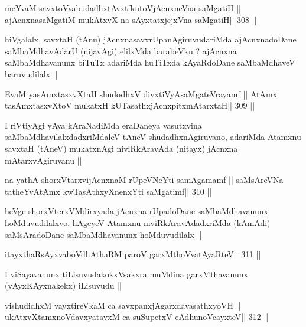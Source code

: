 \begin{shl}
meYvaM savxtoV\s vabudadhxtAvxtfkutoV\s jAcnxneVna saMgatiH ||
ajAcnxnasaMgatiM mukAtxvX na sAyxtatxjejxVna saMgatiH\hfill || 308 ||
\end{shl}

\begin{artha}
hiVgalalx, savxtaH (tAnu) jAcnxnasavxrUpanAgiruvudariMda ajAcnxnadoDane saMbaMdhavAdarU (nijavAgi) elilxMda barabeVku ? ajAcnxna saMbaMdhavanunx biTuTx adariMda huTiTxda kAyaRdoDane saMbaMdhaveV baruvudilalx ||
\end{artha}

\begin{shl}
EvaM yasAmxtasxvXtaH shudodhxV divxtiVyAsaMgateVrayamf ||
AtAmx tasAmxtasxvXtoV mukatxH kUTasathxjAcnxpitxmAtarxtaH\footnotemark[1]\hfill || 309 ||
\end{shl}

\begin{artha}
I riVtiyAgi yAva kAraNadiMda eraDaneya vasutxvina saMbaMdhavilalxdadxriMdaleV tAneV shudadhxnAgiruvano, adariMda Atamxnu savxtaH (tAneV) mukatxnAgi niviRkAravAda (nitayx) jAcnxna mAtarxvAgiruvanu ||
\end{artha}

\begin{shl}
na yathA shorxVtarxvijAcnxnaM rUpeVNeYti samAgamamf ||
saMsAreVNa tatheYvA\s\s tAmx kwTasAthxyXnenxYti saMgatimf\hfill || 310 ||
\end{shl}

\begin{artha}
heVge shorxVterxVMdirxyada jAcnxna rUpadoDane saMbaMdhavanunx hoMduvudilalxvo, hAgeyeV Atamxnu niviRkAravAdadxriMda (kAmAdi) saMsAradoDane saMbaMdhavanunx hoMduvudilalx ||
\end{artha}

\begin{shl}
itayxthaRsAyxvaboVdhAthaRM paroV garxMthoV\s vatAyaRteV\hfill || 311 ||
\end{shl}

\begin{artha}
I viSayavanunx tiLisuvudakokxVsakxra muMdina garxMthavanunx (vAyxKAyxnakekx) iLisuvudu ||
\end{artha}

\begin{shl}
vishudidhxM vayxtireVkaM ca savxpanxjAgarxdavasathxyoVH ||
ukAtxvX\s\s tamxnoV\s davxyatavxM ca suSupetxV cAdhunoVcayxteV\hfill || 312 ||
\end{shl}

